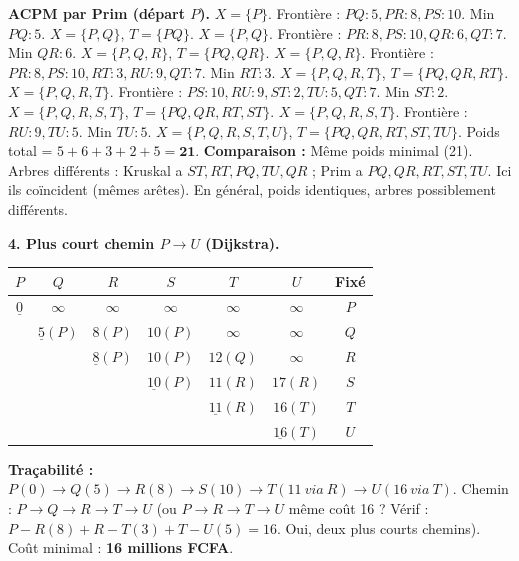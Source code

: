 \documentclass[11pt]{article}
\begin{document}
\begin{exoresolu}
\textbf{ACPM par Prim (départ $P$).}
$X=\{P\}$. Frontière : $PQ:5, PR:8, PS:10$. Min $PQ:5$. $X=\{P,Q\}$, $T=\{PQ\}$.
$X=\{P,Q\}$. Frontière : $PR:8, PS:10, QR:6, QT:7$. Min $QR:6$. $X=\{P,Q,R\}$, $T=\{PQ, QR\}$.
$X=\{P,Q,R\}$. Frontière : $PR:8, PS:10, RT:3, RU:9, QT:7$. Min $RT:3$. $X=\{P,Q,R,T\}$, $T=\{PQ, QR, RT\}$.
$X=\{P,Q,R,T\}$. Frontière : $PS:10, RU:9, ST:2, TU:5, QT:7$. Min $ST:2$. $X=\{P,Q,R,S,T\}$, $T=\{PQ, QR, RT, ST\}$.
$X=\{P,Q,R,S,T\}$. Frontière : $RU:9, TU:5$. Min $TU:5$. $X=\{P,Q,R,S,T,U\}$, $T=\{PQ, QR, RT, ST, TU\}$.
Poids total = $5+6+3+2+5 = \mathbf{21}$.
\textbf{Comparaison :} Même poids minimal (21). Arbres différents : Kruskal a $ST, RT, PQ, TU, QR$ ; Prim a $PQ, QR, RT, ST, TU$. Ici ils coïncident (mêmes arêtes). En général, poids identiques, arbres possiblement différents.

\textbf{4. Plus court chemin $P \to U$ (Dijkstra).}
\begin{center}
\begin{tabular}{|c|c|c|c|c|c|c|}
\hline
\rowcolor{popblueL} $P$ & $Q$ & $R$ & $S$ & $T$ & $U$ & Fixé \\
\hline
$\underline{0}$ & $\infty$ & $\infty$ & $\infty$ & $\infty$ & $\infty$ & $P$ \\
\hline
 & $\underline{5}(P)$ & $8(P)$ & $10(P)$ & $\infty$ & $\infty$ & $Q$ \\
\hline
 &  & $\underline{8}(P)$ & $10(P)$ & $12(Q)$ & $\infty$ & $R$ \\
\hline
 &  &  & $\underline{10}(P)$ & $11(R)$ & $17(R)$ & $S$ \\
\hline
 &  &  &  & $\underline{11}(R)$ & $16(T)$ & $T$ \\
\hline
 &  &  &  &  & $\underline{16}(T)$ & $U$ \\
\hline
\end{tabular}
\end{center}
\textbf{Traçabilité :} $P(0)\to Q(5)\to R(8)\to S(10)\to T(11\ via\ R)\to U(16\ via\ T)$.
Chemin : $P \to Q \to R \to T \to U$ (ou $P\to R\to T\to U$ même coût 16 ? Vérif : $P-R(8)+R-T(3)+T-U(5)=16$. Oui, deux plus courts chemins).
Coût minimal : \textbf{16 millions FCFA}.
\end{exoresolu}
\end{document}
